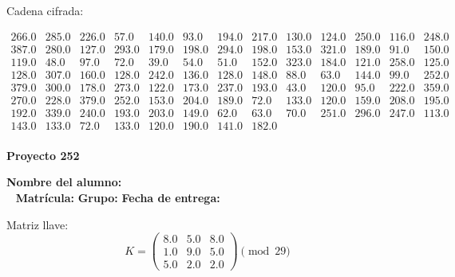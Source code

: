 \documentclass[12pt]{article}
\begin{document}
Cadena cifrada:
\begin{center}
$\begin{array}{lllllllllllll}
266.0 & 285.0 & 226.0 & 57.0 & 140.0 & 93.0 & 194.0 & 217.0 & 130.0 & 124.0 & 250.0 & 116.0 & 248.0\\
387.0 & 280.0 & 127.0 & 293.0 & 179.0 & 198.0 & 294.0 & 198.0 & 153.0 & 321.0 & 189.0 & 91.0 & 150.0\\
119.0 & 48.0 & 97.0 & 72.0 & 39.0 & 54.0 & 51.0 & 152.0 & 323.0 & 184.0 & 121.0 & 258.0 & 125.0\\
128.0 & 307.0 & 160.0 & 128.0 & 242.0 & 136.0 & 128.0 & 148.0 & 88.0 & 63.0 & 144.0 & 99.0 & 252.0\\
379.0 & 300.0 & 178.0 & 273.0 & 122.0 & 173.0 & 237.0 & 193.0 & 43.0 & 120.0 & 95.0 & 222.0 & 359.0\\
270.0 & 228.0 & 379.0 & 252.0 & 153.0 & 204.0 & 189.0 & 72.0 & 133.0 & 120.0 & 159.0 & 208.0 & 195.0\\
192.0 & 339.0 & 240.0 & 193.0 & 203.0 & 149.0 & 62.0 & 63.0 & 70.0 & 251.0 & 296.0 & 247.0 & 113.0\\
143.0 & 133.0 & 72.0 & 133.0 & 120.0 & 190.0 & 141.0 & 182.0\\
\end{array}$
\end{center}

\newpage


\textbf{Proyecto 252}

\textbf{Nombre del alumno:} \underline{\hspace{13cm}}\\\
\vspace{1cm}
\textbf{Matrícula:} \underline{\hspace{4cm}} \hspace{1cm}
\textbf{Grupo:} \underline{\hspace{2cm}}
\textbf{Fecha de entrega:} \underline{\hspace{2cm}}

\medskip

Matriz llave:
\[
K = \begin{pmatrix}
8.0 & 5.0 & 8.0\\
1.0 & 9.0 & 5.0\\
5.0 & 2.0 & 2.0
\end{pmatrix} \pmod{29}
\]
\end{document}
